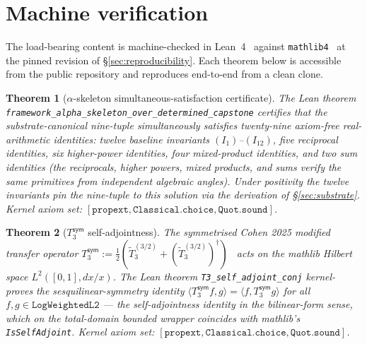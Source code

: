\documentclass[11pt,a4paper]{amsart}
\theoremstyle{plain}
\newtheorem{theorem}{Theorem}[section]
\theoremstyle{definition}
\begin{document}
\section{Machine verification}\label{sec:kernel-verified}

The load-bearing content is machine-checked in Lean~4~\cite{moura-ullrich2021} against \texttt{mathlib4}~\cite{mathlib2020} at the pinned revision of \S\ref{sec:reproducibility}. Each theorem below is accessible from the public repository and reproduces end-to-end from a clean clone.

\begin{theorem}[$\alpha$-skeleton simultaneous-satisfaction certificate]\label{thm:alpha-unique}
The Lean theorem \texttt{framework\_alpha\_skeleton\_over\_determined\_capstone} certifies that the substrate-canonical nine-tuple simultaneously satisfies twenty-nine axiom-free real-arithmetic identities: twelve baseline invariants $(I_1)$--$(I_{12})$, five reciprocal identities, six higher-power identities, four mixed-product identities, and two sum identities (the reciprocals, higher powers, mixed products, and sums verify the same primitives from independent algebraic angles). Under positivity the twelve invariants pin the nine-tuple to this solution via the derivation of \S\ref{sec:substrate}. Kernel axiom set: $[\texttt{propext}, \texttt{Classical.choice}, \texttt{Quot.sound}]$.
\end{theorem}

\begin{theorem}[$T_3^{\textsf{sym}}$ self-adjointness]\label{thm:t3sym}
The symmetrised Cohen 2025 modified transfer operator $T_3^{\textsf{sym}} := \tfrac{1}{2}(\widetilde{T}_3^{(3/2)} + (\widetilde{T}_3^{(3/2)})^\dagger)$~\cite{cohen2025transferOp} acts on the mathlib Hilbert space $L^2([0,1], dx/x)$. The Lean theorem \texttt{T3\_self\_adjoint\_conj} kernel-proves the sesquilinear-symmetry identity $\langle T_3^{\textsf{sym}} f, g \rangle = \langle f, T_3^{\textsf{sym}} g \rangle$ for all $f, g \in \mathtt{LogWeightedL2}$ --- the self-adjointness identity in the bilinear-form sense, which on the total-domain bounded wrapper coincides with mathlib's \texttt{IsSelfAdjoint}. Kernel axiom set: $[\texttt{propext}, \texttt{Classical.choice}, \texttt{Quot.sound}]$.
\end{theorem}
\end{document}
